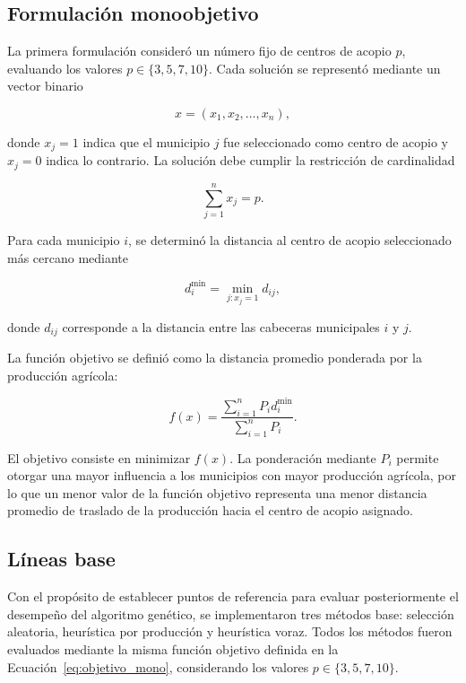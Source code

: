 \documentclass[journal]{IEEEtran}
\begin{document}
\subsection{Formulación monoobjetivo}

La primera formulación consideró un número fijo de centros de acopio $p$, evaluando los valores $p \in \{3,5,7,10\}$. Cada solución se representó mediante un vector binario

\begin{equation}
	x = (x_1,x_2,\ldots,x_n),
\end{equation}

donde $x_j=1$ indica que el municipio $j$ fue seleccionado como centro de acopio y $x_j=0$ indica lo contrario. La solución debe cumplir la restricción de cardinalidad

\begin{equation}
	\sum_{j=1}^{n} x_j = p.
\end{equation}

Para cada municipio $i$, se determinó la distancia al centro de acopio seleccionado más cercano mediante

\begin{equation}
	d_i^{\min} =
	\min_{j:x_j=1} d_{ij},
\end{equation}

donde $d_{ij}$ corresponde a la distancia entre las cabeceras municipales $i$ y $j$.

La función objetivo se definió como la distancia promedio ponderada por la producción agrícola:

\begin{equation}
	f(x)=
	\frac{
		\sum_{i=1}^{n} P_i d_i^{\min}
	}{
		\sum_{i=1}^{n}P_i
	}.
	\label{eq:objetivo_mono}
\end{equation}

El objetivo consiste en minimizar $f(x)$. La ponderación mediante $P_i$ permite otorgar una mayor influencia a los municipios con mayor producción agrícola, por lo que un menor valor de la función objetivo representa una menor distancia promedio de traslado de la producción hacia el centro de acopio asignado.

\subsection{Líneas base}

Con el propósito de establecer puntos de referencia para evaluar posteriormente el desempeño del algoritmo genético, se implementaron tres métodos base: selección aleatoria, heurística por producción y heurística voraz. Todos los métodos fueron evaluados mediante la misma función objetivo definida en la Ecuación~\ref{eq:objetivo_mono}, considerando los valores $p \in \{3,5,7,10\}$.
\end{document}
